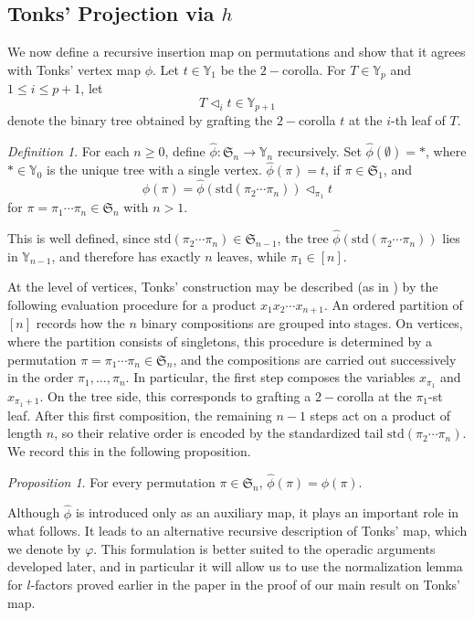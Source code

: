 \documentclass[a4paper]{article}
\theoremstyle{plain}
\theoremstyle{definition}
\theoremstyle{remark}
\numberwithin{equation}{section}
\renewcommand{\le}{\leqslant}\renewcommand{\ge}{\geqslant}
\newcommand{\Sym}{\mathfrak{S}}
\newcommand{\Y}{\mathbb{Y}}
\newcommand{\std}{\mathrm{std}}
\newtheorem{proposition}[theorem]{Proposition}
\newtheorem{definition}[theorem]{Definition}
\begin{document}
\subsection{Tonks' Projection via \(h\)}

We now define a recursive insertion map on permutations and show that it agrees
with Tonks' vertex map \(\phi\). Let \(t\in\Y_1\) be the $2-$corolla. For
\(T\in\Y_p\) and \(1\le i\le p+1\), let
\[
T\triangleleft_i t \in \Y_{p+1}
\]
denote the binary tree obtained by grafting the $2-$corolla \(t\) at
the \(i\)-th leaf of \(T\).

\begin{definition}\label{def:phihat}
For each \(n\ge 0\), define $\widehat\phi:\Sym_n\to\Y_n$ recursively. Set $\widehat\phi(\emptyset)=\ast$, where \(\ast\in\Y_0\) is the unique tree with a single vertex. $\widehat\phi(\pi)=t$, if $\pi\in\Sym_1$, and
\[
\widehat\phi(\pi)=\widehat\phi(\std(\pi_2\cdots \pi_n))\triangleleft_{\pi_1} t
\]
for \(\pi=\pi_1\cdots \pi_n\in\Sym_n\) with \(n>1\).
\end{definition}

This is well defined, since \(\std(\pi_2\cdots \pi_n)\in\Sym_{n-1}\), the tree
\(\widehat\phi(\std(\pi_2\cdots \pi_n))\) lies in \(\Y_{n-1}\), and therefore
has exactly \(n\) leaves, while \(\pi_1\in[n]\).

At the level of vertices, Tonks' construction may be described (as in \cite{Ton}) by the following
evaluation procedure for a product \(x_1x_2\cdots x_{n+1}\). An ordered partition of \([n]\) records how the \(n\) binary compositions are
grouped into stages. On vertices, where the partition consists of singletons,
this procedure is determined by a permutation  $\pi=\pi_1\cdots\pi_n\in\Sym_n$, and the compositions are carried out successively in the order
\(\pi_1,\dots,\pi_n\). In particular, the first step composes the variables
\(x_{\pi_1}\) and \(x_{\pi_1+1}\). On the tree side, this corresponds to
grafting a $2-$corolla at the \(\pi_1\)-st leaf. After this first
composition, the remaining \(n-1\) steps act on a product of length \(n\), so
their relative order is encoded by the standardized tail $\std(\pi_2\cdots\pi_n)$. We record this in the following proposition.

\begin{proposition}\label{prop:phihat-equals-phi}
For every permutation \(\pi\in\Sym_n\), $\widehat\phi(\pi)=\phi(\pi)$.
\end{proposition}

Although \(\widehat\phi\) is introduced only as an auxiliary map, it plays an
important role in what follows. It leads to an alternative recursive
description of Tonks' map, which we denote by \(\varphi\). This formulation is
better suited to the operadic arguments developed later, and in particular it
will allow us to use the normalization lemma for \(l\)-factors proved earlier
in the paper in the proof of our main result on Tonks' map.
\end{document}

